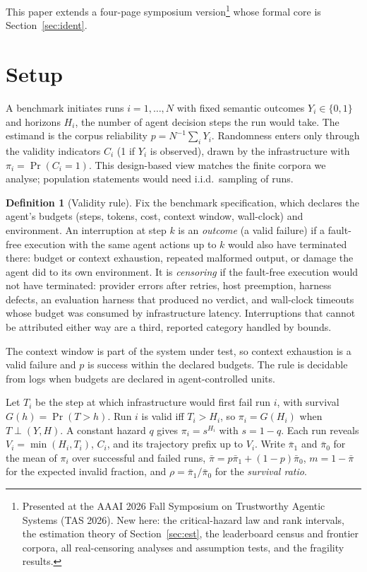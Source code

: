 \documentclass[11pt]{article}
\theoremstyle{definition}
\newtheorem{definition}{Definition}
\theoremstyle{remark}
\newcommand{\pb}{\bar\pi}
\begin{document}
This paper extends a four-page symposium version\footnote{Presented at the AAAI
2026 Fall Symposium on Trustworthy Agentic Systems (TAS 2026). New here: the
critical-hazard law and rank intervals, the estimation theory of
Section~\ref{sec:est}, the leaderboard census and frontier corpora, all
real-censoring analyses and assumption tests, and the fragility results.} whose
formal core is Section~\ref{sec:ident}.

\section{Setup}
\label{sec:setup}

A benchmark initiates runs $i=1,\dots,N$ with fixed semantic outcomes
$Y_i\in\{0,1\}$ and horizons $H_i$, the number of agent decision steps the run
would take. The estimand is the corpus reliability $p=N^{-1}\sum_iY_i$.
Randomness enters only through the validity indicators $C_i$ (1 if $Y_i$ is
observed), drawn by the infrastructure with $\pi_i=\Pr(C_i=1)$. This
design-based view matches the finite corpora we analyse; population statements
would need i.i.d.\ sampling of runs.

\begin{definition}[Validity rule]\label{def:validity}
Fix the benchmark specification, which declares the agent's budgets (steps,
tokens, cost, context window, wall-clock) and environment. An interruption at
step $k$ is an \emph{outcome} (a valid failure) if a fault-free execution with
the same agent actions up to $k$ would also have terminated there: budget or
context exhaustion, repeated malformed output, or damage the agent did to its
own environment. It is \emph{censoring} if the fault-free execution would not
have terminated: provider errors after retries, host preemption, harness defects,
an evaluation harness that produced no verdict, and wall-clock timeouts whose
budget was consumed by infrastructure latency. Interruptions that cannot be
attributed either way are a third, reported category handled by bounds.
\end{definition}

The context window is part of the system under test, so context exhaustion is a
valid failure and $p$ is success within the declared budgets. The rule is
decidable from logs when budgets are declared in agent-controlled units.

Let $T_i$ be the step at which infrastructure would first fail run $i$, with
survival $G(h)=\Pr(T>h)$. Run $i$ is valid iff $T_i>H_i$, so $\pi_i=G(H_i)$
when $T\perp(Y,H)$. A constant hazard $q$ gives $\pi_i=s^{H_i}$ with $s=1-q$.
Each run reveals $V_i=\min(H_i,T_i)$, $C_i$, and its trajectory prefix up to
$V_i$. Write $\pb_1$ and $\pb_0$ for the mean of $\pi_i$ over successful and
failed runs, $\pb=p\pb_1+(1-p)\pb_0$, $m=1-\pb$ for the expected invalid
fraction, and $\rho=\pb_1/\pb_0$ for the \emph{survival ratio}.
\end{document}
